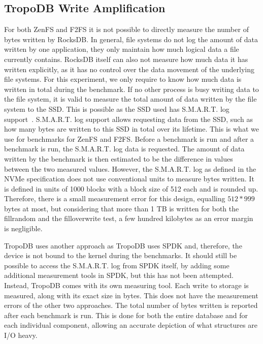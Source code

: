 \subsection{TropoDB Write Amplification}
For both ZenFS and F2FS it is not possible to directly measure the number of bytes written by RocksDB. In general, file systems do not log the amount of data written by one application, they only maintain how much logical data a file currently contains. RocksDB itself can also not measure how much data it has written explicitly, as it has no control over the data movement of the underlying file systems. For this experiment, we only require to know how much data is written in total during the benchmark. If no other process is busy writing data to the file system, it is valid to measure the total amount of data written by the file system to the SSD. This is possible as the SSD used has S.M.A.R.T. log support~\cite{NVMeSpec}. S.M.A.R.T. log support allows requesting data from the SSD, such as how many bytes are written to this SSD in total over its lifetime. This is what we use for benchmarks for ZenFS and F2FS.  Before a benchmark is run and after a benchmark is run, the S.M.A.R.T. log data is requested. The amount of data written by the benchmark is then estimated to be the difference in values between the two measured values. However, the S.M.A.R.T. log as defined in the NVMe specification does not use conventional units to measure bytes written. It is defined in units of 1000 blocks with a block size of 512 each and is rounded up. Therefore, there is a small measurement error for this design, equalling $512*999$ bytes at most, but considering that more than 1 TB is written for both the fillrandom and the filloverwrite test, a few hundred kilobytes as an error margin is negligible. 

TropoDB uses another approach as TropoDB uses SPDK and, therefore, the device is not bound to the kernel during the benchmarks. It should still be possible to access the S.M.A.R.T. log from SPDK itself, by adding some additional measurement tools in SPDK, but this has not been attempted. Instead, TropoDB comes with its own measuring tool. Each write to storage is measured, along with its exact size in bytes. This does not have the measurement errors of the other two approaches. The total number of bytes written is reported after each benchmark is run. This is done for both the entire database and for each individual component, allowing an accurate depiction of what structures are I/O heavy.


